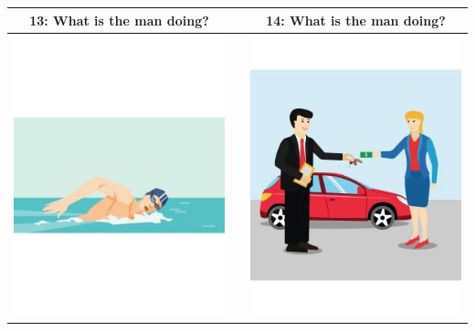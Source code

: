 \documentclass[12pt,notitlepage]{article}
\begin{document}
\begin{center}
\begin{tabular}{|c|c|c|}
\hline
13: What is the man doing? && 14: What is the man doing? \\
\hline
\includegraphics[width=20em,trim=0 0 0 -3]{figures/I13.jpg} & & \includegraphics[width=20em,trim=0 0 0 -3]{figures/I14.jpg} \\
\hline
\end{tabular}
\vspace{1em} \\



\end{center}
\end{document}
